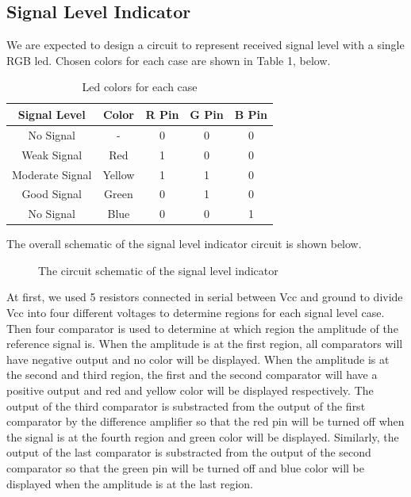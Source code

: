 \documentclass[conference]{IEEEtran}
\begin{document}
\subsection{Signal Level Indicator}
We are expected to design a circuit to represent received signal level with a single RGB led. Chosen colors for 
each case are shown in Table 1, below.
\begin{table}[htbp]
    \caption{Led colors for each case}
    \begin{center}
    \begin{tabular}{|c|c|c|c|c|}
    \hline
    \textbf{Signal Level} & \textbf{Color}& \textbf{R Pin}& \textbf{G Pin}& \textbf{B Pin} \\
    \hline
    No Signal & - & 0 & 0 & 0\\
    \hline
    Weak Signal & Red & 1 & 0 & 0\\
    \hline
    Moderate Signal & Yellow & 1 & 1 & 0\\
    \hline
    Good Signal & Green & 0 & 1 & 0\\
    \hline
    No Signal & Blue & 0 & 0 & 1\\
    \hline
    \end{tabular}
    \label{tab1}
    \end{center}
\end{table}
\par The overall schematic of the signal level indicator circuit is shown below.
\begin{figure}[H]
   \centerline{}
    \caption{The circuit schematic of the signal level indicator}
\end{figure}
\par At first, we used 5 resistors connected in serial between Vcc and ground to divide Vcc into four different voltages 
to determine regions for each signal level case. 
Then four comparator is used to determine at which region the amplitude of the reference signal is. When the amplitude 
is at the first region, all comparators will have negative output and no color will be displayed. When the amplitude 
is at the second and third region, the first and the second comparator will have a positive output and red and yellow 
color will be displayed respectively. The output of the third comparator is substracted from the output of the first 
comparator by the difference amplifier so that the red pin will be turned off when the signal is at the fourth region 
and green color will be displayed. Similarly, the output of the last comparator is substracted from the output of the 
second comparator so that the green pin will be turned off and blue color will be displayed when the amplitude is at the 
last region.
\end{document}
